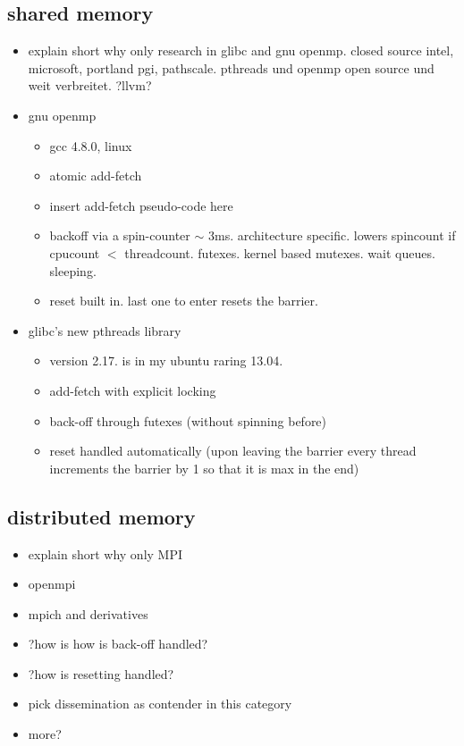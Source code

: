 \documentclass[a4paper, 10pt]{article}
\begin{document}
\subsection{shared memory}
\begin{itemize}
	\item explain short why only research in glibc and gnu openmp. closed source intel, microsoft, portland pgi, pathscale. pthreads und openmp open source und weit verbreitet. ?llvm?
	\item gnu openmp
		\begin{itemize}
			\item gcc 4.8.0, linux
			\item atomic add-fetch
			\item insert add-fetch pseudo-code here
			\item backoff via a spin-counter $\sim$ 3ms. architecture specific. lowers spincount if cpucount $<$ threadcount. futexes. kernel based mutexes. wait queues. sleeping.
			\item reset built in. last one to enter resets the barrier.
		\end{itemize}
	\item glibc's new pthreads library
		\begin{itemize}
			\item version 2.17. is in my ubuntu raring 13.04.
			\item add-fetch with explicit locking
			\item back-off through futexes (without spinning before)
			\item reset handled automatically (upon leaving the barrier every thread increments the barrier by 1 so that it is max in the end)
		\end{itemize}
\end{itemize}

\subsection{distributed memory}
\begin{itemize}
	\item explain short why only MPI
	\item openmpi
	\item mpich and derivatives
	\item ?how is how is back-off handled?
	\item ?how is resetting handled?
	\item pick dissemination as contender in this category
	\item more?
\end{itemize}
\end{document}
